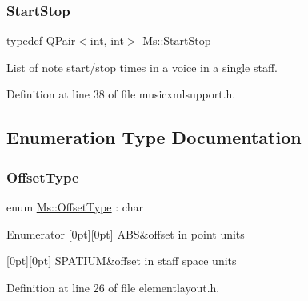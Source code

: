 \subsubsection{\texorpdfstring{Start\+Stop}{StartStop}}
{\footnotesize\ttfamily typedef Q\+Pair$<$int, int$>$ \hyperlink{namespace_ms_a53322ca7de949b92f493bb3b6a5fc202}{Ms\+::\+Start\+Stop}}

List of note start/stop times in a voice in a single staff. 

Definition at line 38 of file musicxmlsupport.\+h.



\subsection{Enumeration Type Documentation}
\mbox{\label{namespace_ms_afe84fbdef0df9b3922d749984380e57a}} 
\subsubsection{\texorpdfstring{Offset\+Type}{OffsetType}}
{\footnotesize\ttfamily enum \hyperlink{namespace_ms_afe84fbdef0df9b3922d749984380e57a}{Ms\+::\+Offset\+Type} \+: char\hspace{0.3cm}{\ttfamily [strong]}}

\begin{DoxyEnumFields}{Enumerator}
[0pt][0pt]{}\mbox{\label{namespace_ms_afe84fbdef0df9b3922d749984380e57aa7d8a220d2262f9d6c658d549ee12cf2c}} 
A\+BS&offset in point units \\
\hline

[0pt][0pt]{}\mbox{\label{namespace_ms_afe84fbdef0df9b3922d749984380e57aa3b6c9bb5569049013d48cbaea675d20b}} 
S\+P\+A\+T\+I\+UM&offset in staff space units \\
\hline

\end{DoxyEnumFields}


Definition at line 26 of file elementlayout.\+h.

